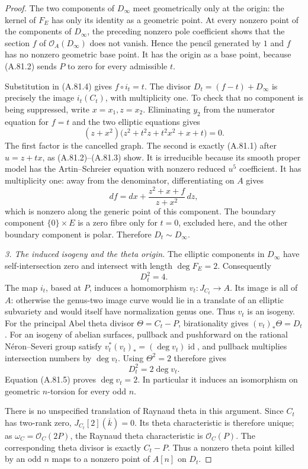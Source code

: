 \documentclass[11pt]{article}
\begin{document}
\begin{proof}
The two components of $D_\infty$ meet geometrically only
at the origin: the kernel of $F_E$ has only its
identity as a geometric point. At every nonzero point of
the components of $D_\infty$, the preceding nonzero pole
coefficient shows that the section $f$ of
$\mathcal O_A(D_\infty)$ does not vanish. Hence the pencil
generated by $1$ and $f$ has no nonzero geometric base point.
It has the origin as a base point, because (A.81.2) sends
$P$ to zero for every admissible $t$.

Substitution in (A.81.4) gives $f\circ i_t=t$.
The divisor $D_t=(f-t)+D_\infty$ is precisely the image
$i_t(C_t)$, with multiplicity one. To check that no
component is being suppressed, write $x=x_1,z=x_2$.
Eliminating $y_2$ from the numerator equation for $f=t$
and the two elliptic equations gives
\[
 (z+x^2)\bigl(z^2+t^2z+t^2x^2+x+t\bigr)=0.
\]
The first factor is the cancelled graph. The second is
exactly (A.81.1) after $u=z+tx$, as (A.81.2)--(A.81.3)
show. It is irreducible because its smooth proper model
has the Artin--Schreier equation with nonzero reduced
$u^5$ coefficient. It has multiplicity one: away from
the denominator, differentiating on $A$ gives
\[
                   df=dx+
                  \frac{z^2+x+f}{z+x^2}\,dz,
\]
which is nonzero along the generic point of this component.
The boundary component $\{0\}\times E$ is a zero fibre
only for $t=0$, excluded here, and the other boundary
component is polar. Therefore $D_t\sim D_\infty$.

\emph{3. The induced isogeny and the theta origin.}
The elliptic components in $D_\infty$ have self-intersection
zero and intersect with length $\deg F_E=2$. Consequently
\[
                         D_t^2=4.                     \tag{A.81.5}
\]
The map $i_t$, based at $P$, induces a homomorphism
$v_t:J_{C_t}\to A$. Its image is all of $A$: otherwise
the genus-two image curve would lie in a translate of an
elliptic subvariety and would itself have normalization
genus one. Thus $v_t$ is an isogeny.
For the principal Abel theta divisor $\Theta=C_t-P$,
birationality gives $(v_t)_*\Theta=D_t$.
For an isogeny of abelian surfaces, pullback and pushforward
on the rational N\'eron--Severi group satisfy
$v_t^*(v_t)_*=(\deg v_t)\operatorname{id}$, and pullback
multiplies intersection numbers by $\deg v_t$.
Using $\Theta^2=2$ therefore gives
\[
                       D_t^2=2\deg v_t.
\]
Equation (A.81.5) proves $\deg v_t=2$.
In particular it induces an isomorphism on geometric
$n$-torsion for every odd $n$.

There is no unspecified translation of Raynaud theta in
this argument. Since $C_t$ has two-rank zero,
$J_{C_t}[2](\overline k)=0$. Its theta characteristic is
therefore unique; as $\omega_C=\mathcal O_C(2P)$, the
Raynaud theta characteristic is $\mathcal O_C(P)$.
The corresponding theta divisor is exactly $C_t-P$.
Thus a nonzero theta point killed by an odd $n$ maps to
a nonzero point of $A[n]$ on $D_t$.


\end{proof}
\end{document}
